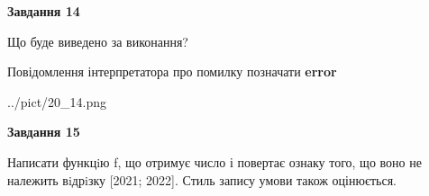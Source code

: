 \documentclass[11pt, ukrainian]{article}
\begin{document}
{\begin {large}
{\begin {center}\textbf{Завдання 14}\end {center}}\par
Що буде виведено за виконання? \par
Повідомлення інтерпретатора про помилку позначати \textbf{error}

\begin{center}
	{../pict/20_14.png}
\end{center}
\newpage

{\begin {center}\textbf{Завдання 15}\end {center}}\par

Написати функцiю f, що отримує число і повертає ознаку того, що воно не належить вiдрiзку [2021; 2022]. Стиль запису умови також оцінюється.\par
\newpage

\end {large}}
\end{document}
